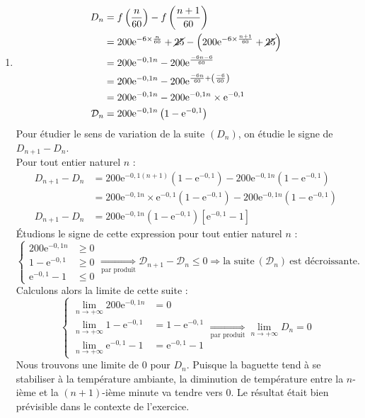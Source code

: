 \documentclass[10pt]{article}
\providecommand{\e}{{\mathrm{e}}}
\begin{document}
\begin{enumerate}
\begin{enumerate}
\item \begin{align*}
{D}_n &=f\left(\dfrac{n}{60}\right)- f\left(\dfrac{n+1}{60}\right) \\
&= 200\e^{- 6 \times \frac{n}{60}} + \cancel{25} - \left(200\e^{-6 \times \frac{n+1}{60}} + \cancel{25}     \right) \\
&= 200\e^{-0,1n} - 200\e^{\frac{-6n-6}{60}} \\
&= 200\e^{-0,1n} - 200\e^{\frac{-6n}{60} + \left(\frac{-6}{60}\right)} \\
&= 200\e^{-0,1n} - 200\e^{-0,1n} \times \e^{-0,1} \\
\mathcal{D}_n &= 200\e^{-0,1n}\left(1-\e^{-0,1}\right)
\end{align*}
Pour étudier le sens de variation de la suite $({D}_n)$, on étudie le signe de ${D}_{n+1}-{D}_n$. \\
Pour tout entier naturel $n$ : 
\begin{align*}
{D}_{n+1}-{D}_n &= 200\e^{-0,1(n+1)}\left(1-\e^{-0,1}\right) - 200\e^{-0,1n}\left(1-\e^{-0,1}\right) \\
&= 200\e^{-0,1n} \times \e^{-0,1} \left(1-\e^{-0,1}\right)- 200\e^{-0,1n}\left(1-\e^{-0,1}\right) \\
{D}_{n+1}-{D}_n &= 200\e^{-0,1n}\left(1-\e^{-0,1}\right) \left[\e^{-0,1}-1\right]
\end{align*}
Étudions le signe de cette expression pour tout entier naturel $n$ : 
\begin{equation*}
\left\{\begin{array}{cc}
200\e^{-0,1n} &\geqslant 0  \\
1-\e^{-0,1} &\geqslant 0 \\
\e^{-0,1}-1 &\leqslant 0
\end{array}\right .
\underset{\text{par produit}}{\Longrightarrow} \mathcal{D}_{n+1}-\mathcal{D}_n \leqslant 0 \Longrightarrow \text{la suite} \ (\mathcal{D}_n) \ \text{est décroissante}.
 \end{equation*}
 Calculons alors la limite de cette suite : 
 \begin{equation*}
\left\{\begin{array}{cl}
\lim\limits_{n \rightarrow + \infty} 200\e^{-0,1n} &= 0  \\
\lim\limits_{n \rightarrow + \infty} 1-\e^{-0,1} &= 1-\e^{-0,1} \\
\lim\limits_{n \rightarrow + \infty} \e^{-0,1}-1 &= \e^{-0,1} -1
\end{array} \right .
\underset{\text{par produit}}{\Longrightarrow} \lim\limits_{n \rightarrow + \infty} {D}_n=0
\end{equation*}
Nous trouvons une limite de $0$ pour ${D}_n$. Puisque la baguette tend à se stabiliser à la température ambiante, la diminution de température entre la $n$-ième  et la $(n+1)$-ième minute va tendre vers $0$. Le résultat était bien prévisible dans le contexte de l'exercice. 
		\end{enumerate}
\end{enumerate}
\end{document}
